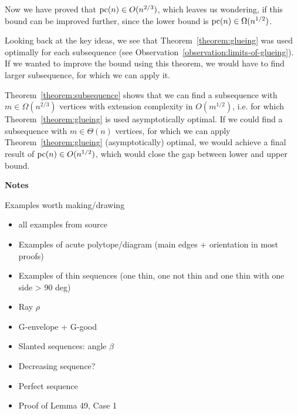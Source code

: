 Now we have proved that $\operatorname{pc}(n) \in O(n^{2/3})$, which leaves us wondering, if this bound can be improved further, since the lower bound is $\operatorname{pc}(n) \in \Omega(n^{1/2})$.

Looking back at the key ideas, we see that Theorem~\ref{theorem:glueing} was used optimally for each subsequence (see Observation~\ref{observation:limits-of-glueing}). If we wanted to improve the bound using this theorem, we would have to find larger subsequence, for which we can apply it.

Theorem~\ref{theorem:subsequence} shows that we can find a subsequence with $m\in\Omega(n^{2/3})$ vertices with extension complexity in $O(m^{1/2})$, i.e. for which Theorem~\ref{theorem:glueing} is used asymptotically optimal. If we could find a subsequence with $m\in\Theta(n)$ vertices, for which we can apply Theorem~\ref{theorem:glueing} (asymptotically) optimal, we would achieve a final result of $\operatorname{pc}(n)\in O(n^{1/2})$, which would close the gap between lower and upper bound.









\newpage
{\Huge \textbf{Notes}}

Examples worth making/drawing
\begin{itemize}
  \item all examples from source
  \item Examples of acute polytope/diagram (main edges + orientation in most proofs)
  \item Examples of thin sequences (one thin, one not thin and one thin with one side > 90 deg)
  \item Ray $\rho$
  \item G-envelope + G-good
  \item Slanted sequences: angle $\beta$
  \item Decreasing sequence?
  \item Perfect sequence
  \item Proof of Lemma 49, Case 1
\end{itemize}
